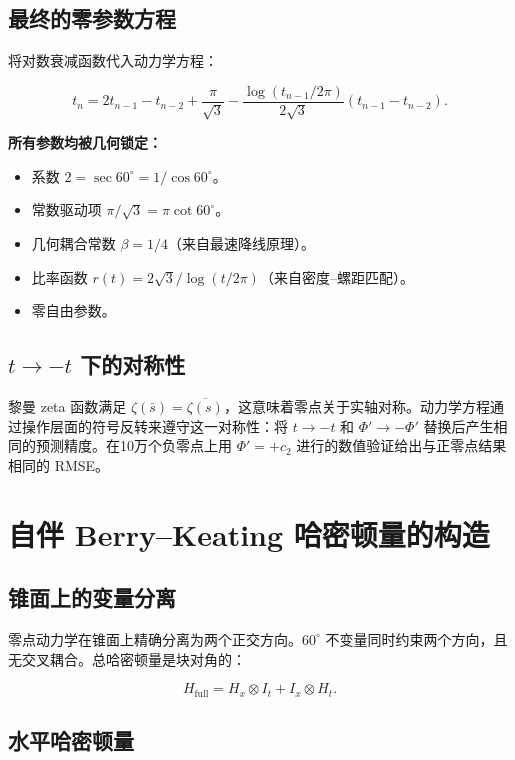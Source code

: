 \documentclass[12pt,a4paper]{article}
\begin{document}
\subsection{最终的零参数方程}

将对数衰减函数代入动力学方程：

\begin{equation}
\boxed{t_n = 2t_{n-1} - t_{n-2} + \frac{\pi}{\sqrt{3}} - \frac{\log(t_{n-1}/2\pi)}{2\sqrt{3}}(t_{n-1} - t_{n-2})}.
\end{equation}

\textbf{所有参数均被几何锁定：}
\begin{itemize}
\item 系数 $2 = \sec 60^\circ = 1/\cos 60^\circ$。
\item 常数驱动项 $\pi/\sqrt{3} = \pi\cot 60^\circ$。
\item 几何耦合常数 $\beta = 1/4$（来自最速降线原理）。
\item 比率函数 $r(t) = 2\sqrt{3}/\log(t/2\pi)$（来自密度--螺距匹配）。
\item 零自由参数。
\end{itemize}

\subsection{$t \to -t$ 下的对称性}

黎曼 zeta 函数满足 $\zeta(\bar{s}) = \overline{\zeta(s)}$，这意味着零点关于实轴对称。动力学方程通过操作层面的符号反转来遵守这一对称性：将 $t \to -t$ 和 $\Phi' \to -\Phi'$ 替换后产生相同的预测精度。在10万个负零点上用 $\Phi' = +c_2$ 进行的数值验证给出与正零点结果相同的 RMSE。

\section{自伴 Berry--Keating 哈密顿量的构造}

\subsection{锥面上的变量分离}

零点动力学在锥面上精确分离为两个正交方向。$60^\circ$ 不变量同时约束两个方向，且无交叉耦合。总哈密顿量是块对角的：

\begin{equation}
H_{\text{full}} = H_x \otimes I_t + I_x \otimes H_t.
\end{equation}

\subsection{水平哈密顿量}
\end{document}
